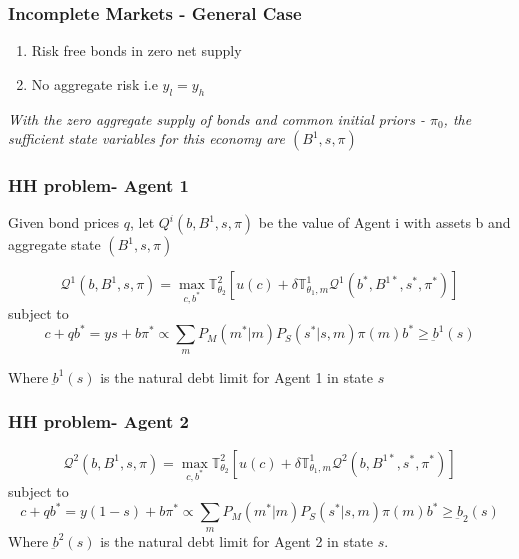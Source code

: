 \documentclass{beamer}
\theoremstyle{definition}
\begin{document}
\begin{frame}
\frametitle{Incomplete Markets - General Case}
\begin{enumerate}
	\item Risk free bonds in zero net supply
	\item No aggregate risk i.e $y_{l}=y_{h}$
	\end{enumerate}
\emph{With the zero aggregate supply of bonds and common initial priors - $\pi_0$, the sufficient state variables for this economy are $(B^1, s, \pi)$ }

\end{frame}

\begin{frame}
\frametitle{HH problem- Agent 1 }
\noindent Given bond prices $q$, let $Q^i(b,B^1,s,\pi)$ be the value of Agent i with assets b and aggregate state $(B^1,s,\pi)$

\begin{equation}
\label{BEAgent1ValueFunction}
\mathcal{Q}^1(b,B^1,s,\pi)=\max_{c,b^*} { \mathbb{T}^2_{\theta_2} \left[u(c)+\delta \mathbb{T}^1_{\theta_1,m}\mathcal{Q}^1 (b^*,B^{1*},s^*,\pi^*)\right]}
\end{equation}
subject to
\begin{subequations}
\begin{equation}
c+qb^*=ys+b
\end{equation}
\begin{equation}
\pi^* \propto \sum_{m}{P_M(m^*|m)P_S(s^*|s,m)\pi(m)}
\end{equation}
\begin{equation}
b^* \geq \underbar{b}^1(s)
\end{equation}
\end{subequations}

Where $\underbar{b}^1(s)$ is the natural debt limit for Agent 1 in state $s$
\end{frame}





\begin{frame}
\frametitle{HH problem- Agent 2 }
\begin{equation}
\label{BEAgent2ValueFunction}
\mathcal{Q}^2(b,B^1,s,\pi)=\max_{c,b^*} { \mathbb{T}^2_{\theta_2} \left[u(c)+\delta \mathbb{T}^1_{\theta_1,m}\mathcal{Q}^2 (b,B^{1*},s^*,\pi^*)\right]}
\end{equation}
subject to
\begin{subequations}
\begin{equation}
c+qb^*=y(1-s)+b
\end{equation}
\begin{equation}
\pi^* \propto \sum_{m}{P_M(m^*|m)P_S(s^*|s,m)\pi(m)}
\end{equation}
\begin{equation}
b^* \geq \underbar{b}_2 (s)
\end{equation}
\end{subequations}
Where $\underbar{b}^2(s)$ is the natural debt limit for Agent 2 in state $s$. 
\end{frame}
\end{document}
